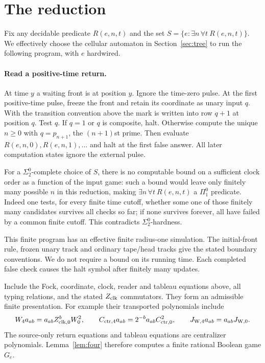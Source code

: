 \section{The reduction}\label{sec:reduction}
Fix any decidable predicate $R(e,n,t)$ and the set $S=\{e:\exists n\,\forall t\ R(e,n,t)\}$. We effectively choose the cellular automaton in Section~\ref{sec:tree} to run the following program, with $e$ hardwired.

\paragraph{Read a positive-time return.}
At time $y$ a waiting front is at position $y$. Ignore the time-zero pulse. At the first positive-time pulse, freeze the front and retain its coordinate as unary input $q$. With the transition convention above the mark is written into row $q+1$ at position $q$. Test $q$. If $q=1$ or $q$ is composite, halt. Otherwise compute the unique $n\geq0$ with $q=p_{n+1}$, the $(n+1)$st prime. Then evaluate $R(e,n,0),R(e,n,1),\ldots$ and halt at the first false answer. All later computation states ignore the external pulse.

For a $\Sigma^0_2$-complete choice of $S$, there is no computable bound on a sufficient clock order as a function
of the input game: such a bound would leave only finitely many possible
$n$ in this reduction, making $\exists n\,\forall t\ R(e,n,t)$ a
$\Pi^0_1$ predicate. Indeed one tests, for every finite time cutoff, whether
some one of those finitely many candidates survives all checks so far;
if none survives forever, all have failed by a common finite cutoff.
This contradicts $\Sigma^0_2$-hardness.

This finite program has an effective finite radius-one simulation. The initial-front rule, frozen unary track and ordinary tape/head tracks give the stated boundary conventions. We do not require a bound on its running time. Each completed false check causes the halt symbol after finitely many updates.

Include the Fock, coordinate, clock, reader and tableau equations above, all typing relations, and the stated $Z_{\rm clk}$ commutators. They form an admissible finite presentation. For example their transported polynomials include
\[
 W_4a_{ab}=a_{ab}Z_{{\rm clk},0}^bW_0^2,\qquad
 C_{{\rm ctr},4}a_{ab}=2^{-b}a_{ab}C_{{\rm ctr},0}^2,\qquad
 J_{{\rm W},4}a_{ab}=a_{ab}J_{{\rm W},0}.
\]
The source-only return equations and tableau equations are centralizer polynomials. Lemma~\ref{lem:four} therefore computes a finite rational Boolean game $G_e$.

